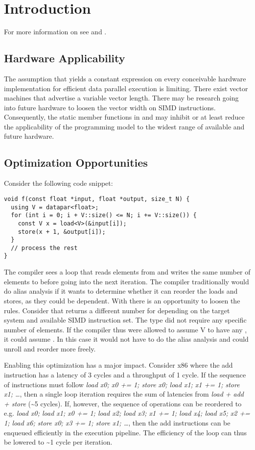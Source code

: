 \section{Introduction}

For more information on \datapar see \cite{P0214R0} and \cite{Kretz2015}.

\subsection{Hardware Applicability}
The assumption that \datapar[<T>::size()] yields a constant expression on every conceivable hardware implementation for efficient data parallel execution is limiting.
There exist vector machines that advertise a variable vector length.
There may be research going into future hardware to loosen the vector width on SIMD instructions.
Consequently, the static member functions  in \datapar and \mask may inhibit or at least reduce the applicability of the programming model to the widest range of available and future hardware.

\subsection{Optimization Opportunities}
Consider the following code snippet:
\smallskip\begin{lstlisting}[style=Vc]
void f(const float *input, float *output, size_t N) {
  using V = datapar<float>;
  for (int i = 0; i + V::size() <= N; i += V::size()) {
    const V x = load<V>(&input[i]);
    store(x + 1, &output[i]);
  }
  // process the rest
}
\end{lstlisting}
The compiler sees a loop that reads  elements from  and writes the same number of elements to  before going into the next iteration.
The compiler traditionally would do alias analysis if it wants to determine whether it can reorder the loads and stores, as they could be dependent.
With \datapar there is an opportunity to loosen the rules.
Consider that \datapar[<float>] returns a different number for  depending on the target system and available SIMD instruction set.
The type did not require any specific number of elements.
If the compiler thus were allowed to assume \type V to have any , it could assume .
In this case it would not have to do the alias analysis and could unroll and reorder more freely.

Enabling this optimization has a major impact.
Consider x86 where the \float add instruction has a latency of 3 cycles and a throughput of 1 cycle.
If the sequence of instructions must follow \textit{load x0; x0 += 1; store x0; load x1; x1 += 1; store x1; \ldots}, then a single loop iteration requires the sum of latencies from \textit{load + add + store} (\textasciitilde{}5 cycles).
If, however, the sequence of operations can be reordered to e.g. \textit{load x0; load x1; x0 += 1; load x2; load x3; x1 += 1; load x4; load x5; x2 += 1; load x6; store x0; x3 += 1; store x1; \dots}, then the add instructions can be enqueued efficiently in the execution pipeline.
The efficiency of the loop can thus be lowered to \textasciitilde{}1 cycle per iteration.

